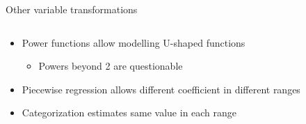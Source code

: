 \begin{frame}{Other variable transformations}
  \begin{columns}
    \begin{column}{0.65\textwidth}
      \begin{itemize}
        \item {Power functions allow modelling U-shaped functions}
        \begin{itemize}
          \item {Powers beyond 2 are questionable}
        \end{itemize}
        \item {Piecewise regression allows different coefficient in different ranges}
        \item {Categorization estimates same value in each range}
      \end{itemize}
    \end{column}~%
    \begin{column}{0.34\textwidth}

\end{column}
\end{columns}
\end{frame}
